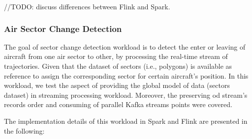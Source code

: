 \documentclass[]{article}
\begin{document}
\begin{itemize}
//TODO: discuss differences between Flink and Spark.

\end{itemize}

\subsubsection{Air Sector Change Detection}

The goal of sector change detection workload is to detect the  enter or leaving of aircraft from one air sector to other, by processing the real-time stream of trajectories. Given that the dataset of sectors (i.e., polygons) is available as reference to assign the corresponding sector for certain aircraft's position. In this workload, we test the aspect of providing the  global model of data (sectors dataset) in streaming processing workload. Moreover, the preserving od stream's records order and consuming of parallel Kafka streams points were covered.
 
 The implementation details of this workload in Spark and Flink are presented in the following: 
 
\end{document}
